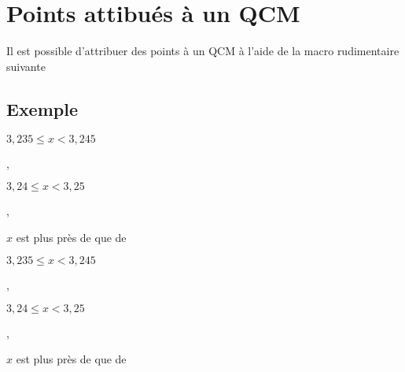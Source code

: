 \section{Points attibués à un QCM}

Il est possible d'attribuer des points à un QCM à l'aide de la macro rudimentaire suivante 

\begin{tkzltxexample}[small]
 \newcommand\AQpoints[1]{%
 \marginpar{\hspace*{1em}    
 \begin{tabular}{|c|}
   \hline  
   \textbf{#1}\\ 
   \hline\\ 
   \hline 
 \end{tabular}}} 
\end{tkzltxexample}
  
\subsection{Exemple} 

\begin{tkzltxexample}[]
  \begin{alterqcm}[symb = \dingsquare, lq=7cm]
  {{\begin{minipage}[t]{\linewidth-1cm}$3,235\leqslant x <3,245$\\
    \end{minipage}} ,
   {\begin{minipage}[t]{\linewidth-1cm} $3,24\leqslant x <3,25$\\
    \end{minipage}} ,
   {\begin{minipage}[t]{\linewidth-1cm}
       $x$ est plus près de  que de 
    \end{minipage}}}
  \end{alterqcm}
\end{tkzltxexample}

\medskip
{}
  \begin{alterqcm}[symb = \dingsquare, lq=7cm]
  {{\begin{minipage}[t]{\linewidth-1cm}$3,235\leqslant x <3,245$\\
    \end{minipage}} ,
   {\begin{minipage}[t]{\linewidth-1cm} $3,24\leqslant x <3,25$\\
    \end{minipage}} ,
   {\begin{minipage}[t]{\linewidth-1cm}
       $x$ est plus près de  que de 
    \end{minipage}}}
\end{alterqcm}   
\endinput  